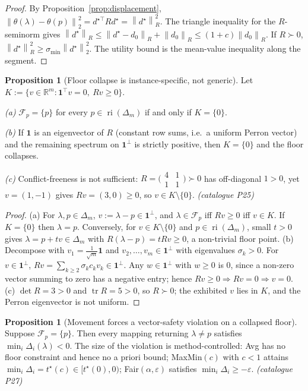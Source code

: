 \documentclass[12pt,a4paper]{report}
\newcommand{\R}{\mathbb{R}}
\newcommand{\1}{\mathbf{1}}
\newcommand{\norm}[1]{\left\lVert #1 \right\rVert}
\newcommand{\Floor}{\mathcal{F}_{p}}
\DeclareMathOperator{\ri}{ri}
\DeclareMathOperator{\tr}{tr}
\theoremstyle{definition}
\newtheorem{proposition}[definition]{Proposition}
\begin{document}
\begin{proof}
By Proposition~\ref{prop:displacement}, \(\norm{\theta(\lambda)-\theta(p)}_2^2=d^{\star\top}Rd^\star=\norm{d^\star}_R^2\). The triangle inequality for the \(R\)-seminorm gives \(\norm{d^\star}_R\le\norm{d^\star-d_0}_R+\norm{d_0}_R\le(1+c)\norm{d_0}_R\). If \(R\succ0\), \(\norm{d^\star}_R^2\ge\sigma_{\min}\norm{d^\star}_2^2\). The utility bound is the mean-value inequality along the segment.
\end{proof}

\begin{proposition}[Floor collapse is instance-specific, not generic]
\label{prop:floor-collapse-criterion}
Let \(K:=\{v\in\R^m:\1^\top v=0,\ Rv\ge0\}\).

\emph{(a)} \(\Floor=\{p\}\) for every \(p\in\ri(\Delta_m)\) if and only if \(K=\{0\}\).

\emph{(b)} If \(\1\) is an eigenvector of \(R\) (constant row sums, i.e.\ a uniform Perron vector) and the remaining spectrum on \(\1^\perp\) is strictly positive, then \(K=\{0\}\) and the floor collapses.

\emph{(c)} Conflict-freeness is not sufficient: \(R=\bigl(\begin{smallmatrix}4&1\\1&1\end{smallmatrix}\bigr)\succ0\) has off-diagonal \(1>0\), yet \(v=(1,-1)\) gives \(Rv=(3,0)\ge0\), so \(v\in K\setminus\{0\}\). \emph{(catalogue P25)}
\end{proposition}

\begin{proof}
(a) For \(\lambda,p\in\Delta_m\), \(v:=\lambda-p\in\1^\perp\), and \(\lambda\in\Floor\) iff \(Rv\ge0\) iff \(v\in K\). If \(K=\{0\}\) then \(\lambda=p\). Conversely, for \(v\in K\setminus\{0\}\) and \(p\in\ri(\Delta_m)\), small \(t>0\) gives \(\lambda=p+tv\in\Delta_m\) with \(R(\lambda-p)=tRv\ge0\), a non-trivial floor point. (b) Decompose with \(v_1=\tfrac{1}{\sqrt m}\1\) and \(v_2,\dots,v_m\in\1^\perp\) with eigenvalues \(\sigma_k>0\). For \(v\in\1^\perp\), \(Rv=\sum_{k\ge2}\sigma_k c_k v_k\in\1^\perp\). Any \(w\in\1^\perp\) with \(w\ge0\) is \(0\), since a non-zero vector summing to zero has a negative entry; hence \(Rv\ge0\Rightarrow Rv=0\Rightarrow v=0\). (c) \(\det R=3>0\) and \(\tr R=5>0\), so \(R\succ0\); the exhibited \(v\) lies in \(K\), and the Perron eigenvector is not uniform.
\end{proof}

\begin{proposition}[Movement forces a vector-safety violation on a collapsed floor]
\label{prop:movement-violation}
Suppose \(\Floor=\{p\}\). Then every mapping returning \(\lambda\ne p\) satisfies \(\min_i\Delta_i(\lambda)<0\). The size of the violation is method-controlled: Avg has no floor constraint and hence no a priori bound; MaxMin\((c)\) with \(c<1\) attains \(\min_i\Delta_i=t^\star(c)\in[t^\star(0),0)\); Fair\((\alpha,\varepsilon)\) satisfies \(\min_i\Delta_i\ge-\varepsilon\). \emph{(catalogue P27)}
\end{proposition}
\end{document}
